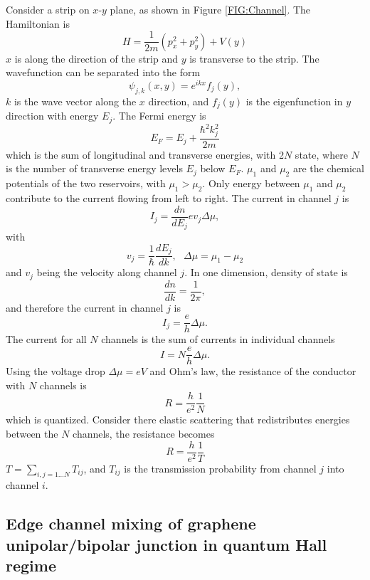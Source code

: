 \documentclass[pdflatex, sectionletters, 12pt]{pittetd}    %
\begin{document}
Consider a strip on $x$-$y$ plane, as shown in Figure \ref{FIG:Channel}. The Hamiltonian is
$$
H = \frac{1}{2m}\left(p_x^2 + p_y^2\right) + V(y)
$$ 
$x$ is along the direction of the strip and $y$ is transverse to the strip. The wavefunction can be separated into the form
$$
\psi_{j, k}(x, y) = e^{ikx} f_j(y),
$$
$k$ is the wave vector along the $x$ direction, and $f_j(y)$ is the eigenfunction in $y$ direction with energy $E_j$. The Fermi energy is 
$$
E_F = E_j + \frac{\hbar^2 k_j^2}{2m}
$$
which is the sum of longitudinal and transverse energies, with 2$N$ state, where $N$ is the number of transverse energy levels $E_j$ below $E_F$. $\mu_1$ and $\mu_2$ are the chemical potentials of the two reservoirs, with $\mu_1 > \mu_2$. Only energy between $\mu_1$ and $\mu_2$ contribute to the current flowing from left to right. The current in channel $j$ is 
$$
I_j = \frac{dn}{dE_j}ev_j\Delta\mu,
$$
with 
$$
v_j = \frac{1}{\hbar}\frac{dE_j}{dk}, \ \ \ \Delta \mu = \mu_1 - \mu_2
$$
and $v_j$ being the velocity along channel $j$. In one dimension, density of state is
$$
\frac{dn}{dk} = \frac{1}{2\pi},
$$
and therefore the current in channel $j$ is
$$
I_j = \frac{e}{h}\Delta\mu.
$$
The current for all $N$ channels is the sum of currents in individual channels
$$I = N\frac{e}{h}\Delta\mu.$$
Using the voltage drop $\Delta \mu = eV$ and Ohm's law, the resistance of the conductor with $N$ channels is
$$
R = \frac{h}{e^2}\frac{1}{N}
$$ 
which is quantized. Consider there elastic scattering that redistributes energies between the $N$ channels, the resistance becomes\cite{buttiker1988absence}
$$
R = \frac{h}{e^2}\frac{1}{T}
$$
$T = \sum_{i,j=1\ldots N} T_{ij}$, and $T_{ij}$ is the transmission probability from channel $j$ into channel $i$. 

\subsection{Edge channel mixing of graphene unipolar/bipolar junction in quantum Hall regime}
\end{document}
